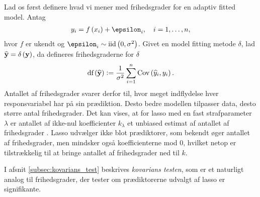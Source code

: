 Lad os først definere hvad vi mener med frihedsgrader for en adaptiv fitted model. 
Antag
\begin{align*}
y_i = f \del{x_i} + \epsilon_i, \quad i = 1, \ldots, n,
\end{align*}
hvor \(f\) er ukendt og \(\epsilon_i \sim \text{iid} \del{0, \sigma^2}\).
Givet en model fitting metode \(\delta\), lad \(\widehat{\y} = \delta \del{\y}\), da defineres frihedsgraderne for \(\delta\) 
\begin{align}
\text{df}\del{\widehat{\y}} := \frac{1}{\sigma^2} \sum_{i=1}^n \text{Cov}\del{\widehat{y}_i, y_i}. \label{eq:df_lasso}
\end{align}
Antallet af frihedsgrader svarer derfor til, hvor meget indflydelse hver responsvariabel har på sin prædiktion.
Desto bedre modellen tilpasser data, desto større antal frihedsgrader.
Det kan vises, at for lasso med en fast strafparameter \(\lambda\) er antallet af ikke-nul koefficienter \(k_\lambda\) et unbiased estimat af antallet af frihedsgrader \citep{df_lasso}.
%
Lasso udvælger ikke blot prædiktorer, som bekendt øger antallet af frihedsgrader, men mindsker også koefficienterne mod 0, hvilket netop er tilstrækkelig til at bringe antallet af frihedsgrader ned til \(k\).

I afsnit \ref{subsec:kovarians_test} beskrives \textit{kovarians testen}, som er et naturligt analog til frihedsgrader, der tester om prædiktorerne udvalgt af lasso er signifikante.
